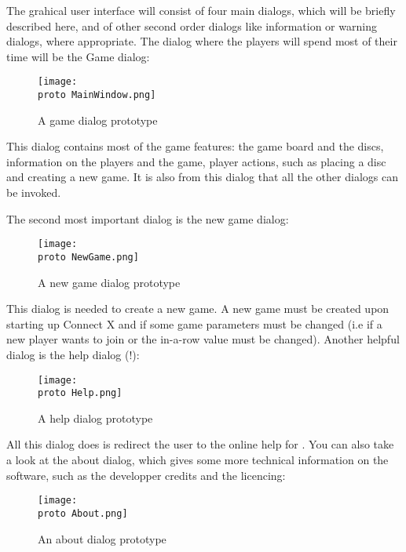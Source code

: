 The  grahical user interface will consist of four main dialogs,
which will be briefly described here, and of other second order dialogs like
information or warning dialogs, where appropriate. The dialog where the players
will spend most of their time will be the Game dialog:

\begin{figure}[H]
  \texttt{[image: \\proto MainWindow.png]}
  \caption{A game dialog prototype}
  \label{fig:Game}
\end{figure}

This dialog contains most of the game features: the game board and the discs,
information on the players and the game, player actions, such as placing a
disc and creating a new game. It is also from this dialog that all the other
dialogs can be invoked.

The second most important dialog is the new game dialog:

\begin{figure}[H]
  \texttt{[image: \\proto NewGame.png]}
  \caption{A new game dialog prototype}
  \label{fig:NewGame}
\end{figure}

This dialog is needed to create a new game. A new game must be created upon
starting up Connect X and if some game parameters must be changed (i.e if
a new player wants to join or the in-a-row value must be changed). Another
helpful dialog is the help dialog (!):

\begin{figure}[H]
  \texttt{[image: \\proto Help.png]}
  \caption{A help dialog prototype}
  \label{fig:Help}
\end{figure}

All this dialog does is redirect the user to the online help for .
You can also take a look at the about dialog, which gives some more technical
information on the software, such as the developper credits and the licencing:

\begin{figure}[H]
  \texttt{[image: \\proto About.png]}
  \caption{An about dialog prototype}
  \label{fig:AboutCX}
\end{figure}
